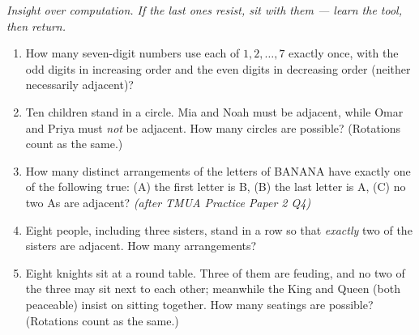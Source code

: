 \documentclass[11pt,a4paper]{article}
\begin{document}
\noindent\textit{Insight over computation. If the last ones resist, sit with them --- learn the tool, then return.}

\begin{enumerate}

\item How many seven-digit numbers use each of $1,2,\ldots,7$ exactly once, with the odd digits in increasing order and the even digits in decreasing order (neither necessarily adjacent)?

\item Ten children stand in a circle. Mia and Noah must be adjacent, while Omar and Priya must \emph{not} be adjacent. How many circles are possible? (Rotations count as the same.)

\item How many distinct arrangements of the letters of BANANA have exactly one of the following true: (A) the first letter is B, (B) the last letter is A, (C) no two As are adjacent? \textit{\small(after TMUA Practice Paper 2 Q4)}

\item Eight people, including three sisters, stand in a row so that \emph{exactly} two of the sisters are adjacent. How many arrangements?

\item Eight knights sit at a round table. Three of them are feuding, and no two of the three may sit next to each other; meanwhile the King and Queen (both peaceable) insist on sitting together. How many seatings are possible? (Rotations count as the same.)

\end{enumerate}

\end{document}
